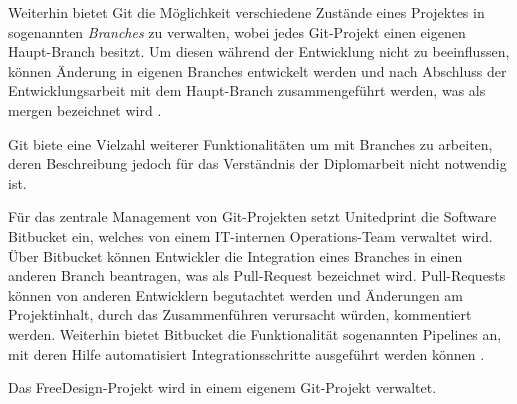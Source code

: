 Weiterhin bietet Git die Möglichkeit verschiedene Zustände eines Projektes in sogenannten \emph{Branches} zu verwalten, wobei jedes Git-Projekt einen eigenen Haupt-Branch besitzt. Um diesen während der 
Entwicklung nicht zu beeinflussen, können Änderung in eigenen Branches entwickelt werden und nach Abschluss der Entwicklungsarbeit mit dem Haupt-Branch zusammengeführt werden, was als mergen bezeichnet wird \autocite[vgl.][]{Git:Branching}. 

Git biete eine Vielzahl weiterer Funktionalitäten um mit Branches zu arbeiten, deren Beschreibung jedoch für das Verständnis der Diplomarbeit nicht notwendig ist. 

Für das zentrale Management von Git-Projekten setzt Unitedprint die Software Bitbucket ein, welches von einem IT-internen Operations-Team verwaltet wird. Über Bitbucket können Entwickler die Integration eines Branches in einen anderen Branch beantragen, was als Pull-Request bezeichnet wird. Pull-Requests können von anderen Entwicklern begutachtet werden und Änderungen am Projektinhalt, durch das Zusammenführen verursacht würden, kommentiert werden. Weiterhin bietet Bitbucket die Funktionalität sogenannten Pipelines an, mit deren Hilfe automatisiert Integrationsschritte ausgeführt werden können \autocite[vgl.][]{Bitbucket:Product}.

Das FreeDesign-Projekt wird in einem eigenem Git-Projekt verwaltet.
